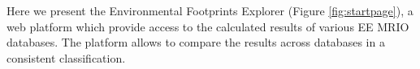 Here we present the Environmental Footprints Explorer (Figure \ref{fig:startpage}), a web platform which provide access to the calculated results of
various EE MRIO databases. The platform allows to compare the results across
databases in a consistent classification. 